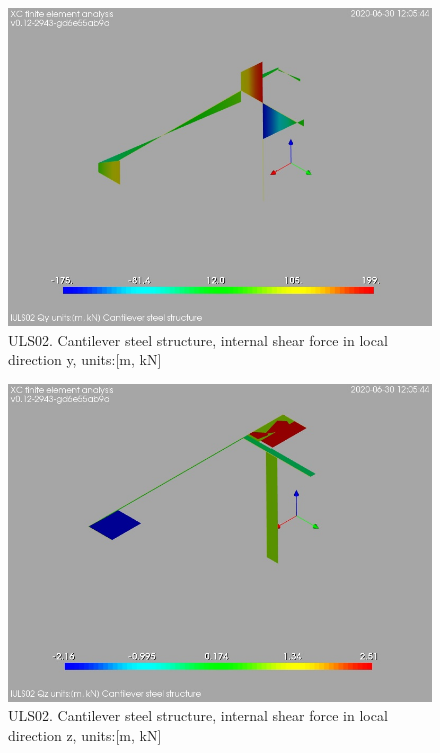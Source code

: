 \begin{figure}
\begin{center}
\includegraphics[width=\linewidth]{ramp_wall/resLC/text/graphics/resSimplLC/lULS02steelMembersQy}
\caption{ULS02. Cantilever steel structure, internal shear force in local direction y, units:[m, kN]}
\end{center}
\end{figure}
\begin{figure}
\begin{center}
\includegraphics[width=\linewidth]{ramp_wall/resLC/text/graphics/resSimplLC/lULS02steelMembersQz}
\caption{ULS02. Cantilever steel structure, internal shear force in local direction z, units:[m, kN]}
\end{center}
\end{figure}
